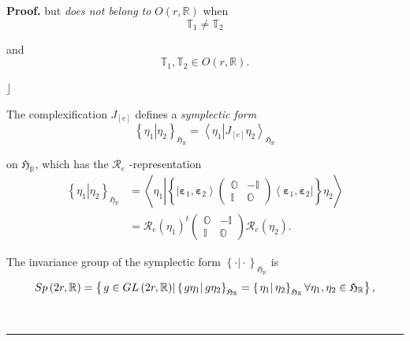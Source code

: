 \documentclass[aps,preprint]{revtex4}
\newenvironment{proof}[1][Proof]{\noindent\textbf{#1.} }{\ \rule{0.5em}{0.5em}}
\begin{document}
\begin{proof}
but \emph{does not belong to} $O\left( r,\mathbb{R}\right) $ when 
\begin{equation}
\mathbb{T}_{1}\neq\mathbb{T}_{2}
\end{equation}

and 
\begin{equation}
\mathbb{T}_{1},\mathbb{T}_{2}\in O\left( r,\mathbb{R}\right) .
\end{equation}

$\rfloor$

The complexification $J_{\left[ e\right] }$ defines a \emph{symplectic form} 
\begin{equation}
\left\{ \left. \eta_{1}\right\vert \eta_{2}\right\} _{\mathfrak{H}_{\mathbb{R%
}}}=\left\langle \left. \eta_{1}\right\vert J_{\left[ e\right]
}\eta_{2}\right\rangle _{\mathfrak{H}_{\mathbb{R}}}
\end{equation}

on $\mathfrak{H}_{\mathbb{R}}$, which has the $\mathcal{R}_{e}$%
-representation 
\begin{align}
\left\{ \left. \eta_{1}\right\vert \eta_{2}\right\} _{\mathfrak{H}_{\mathbb{R%
}}} & =\left\langle \eta_{1}\left\vert \left\{ \left\vert \mathbf{\varepsilon%
}_{1},\mathbf{\varepsilon}_{2}\right\rangle \left( 
\begin{array}{cc}
\mathbb{O} & -\mathbb{I} \\ 
\mathbb{I} & \mathbb{O}%
\end{array}
\right) \left\langle \mathbf{\varepsilon}_{1},\mathbf{\varepsilon}%
_{2}\right\vert \right\} \right. \eta_{2}\right\rangle \\
& =\mathcal{R}_{e}\left( \eta_{1}\right) ^{t}\left( 
\begin{array}{cc}
\mathbb{O} & -\mathbb{I} \\ 
\mathbb{I} & \mathbb{O}%
\end{array}
\right) \mathcal{R}_{e}\left( \eta_{2}\right) .
\end{align}

The invariance group of the symplectic form $\left\{ \left. \cdot\right\vert
\cdot\right\} _{\mathfrak{H}_{\mathbb{R}}}$ is 
\begin{equation}
Sp\left( 2r,\mathbb{R}\right) =\left\{ \left. g\in GL\left( 2r,\mathbb{R}%
\right) \right\vert \left\{ \left. g\eta_{1}\right\vert g\eta_{2}\right\} _{%
\mathfrak{H}_{\mathbb{R}}}=\left\{ \left. \eta _{1}\right\vert
\eta_{2}\right\} _{\mathfrak{H}_{\mathbb{R}}}\forall\eta _{1},\eta_{2}\in%
\mathfrak{H}_{\mathbb{R}}\right\} ,
\end{equation}


\end{proof}
\end{document}
